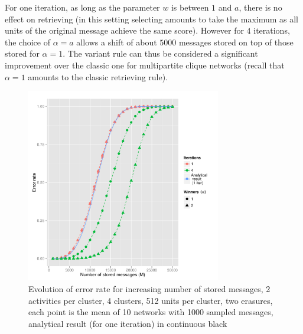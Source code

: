 \documentclass[english,10pt,twocolumn]{IEEEtran}
\theoremstyle{definition}
\begin{document}
		 For one iteration, as long as the parameter $w$ is between $1$ and $a$, there is no effect on retrieving (in this setting selecting amounts to take the maximum as all units of the original message achieve the same score). However for $4$ iterations, the choice of $\alpha = a$ allows a shift of about $5000$ messages stored on top of those stored for $\alpha = 1$. The variant rule can thus be considered a significant improvement over the classic one for multipartite clique networks (recall that $\alpha = 1$ amounts to the classic retrieving rule).
		
		
	

	
	
	
		
	
	
	
		
		\begin{figure}[!htb]
		\includegraphics[width=8.5cm]{Courbes/fig3c4l512e2a2} %
		\caption{Evolution of error rate for increasing number of stored messages, 2 activities per cluster, 4 clusters, 512 units per cluster, two erasures, each point is the mean of 10 networks with 1000 sampled messages, analytical result (for one iteration) in continuous black}
			\label{erasuresth}
		\end{figure}		
		
\end{document}
